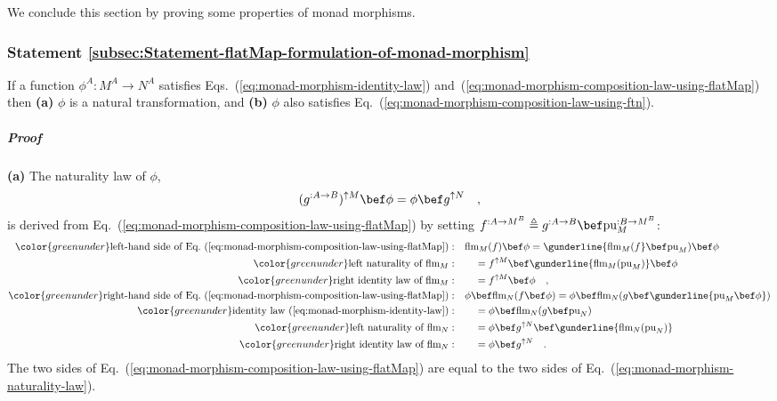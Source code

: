 We conclude this section by proving some properties of monad morphisms.

\subsubsection{Statement \label{subsec:Statement-flatMap-formulation-of-monad-morphism}\ref{subsec:Statement-flatMap-formulation-of-monad-morphism}}

If a function $\phi^{A}:M^{A}\rightarrow N^{A}$ satisfies Eqs.~(\ref{eq:monad-morphism-identity-law})
and~(\ref{eq:monad-morphism-composition-law-using-flatMap}) then
\textbf{(a)} $\phi$ is a natural transformation, and \textbf{(b)}
$\phi$ also satisfies Eq.~(\ref{eq:monad-morphism-composition-law-using-ftn}).

\subparagraph{Proof}

\textbf{(a)} The naturality law of $\phi$,
\begin{equation}
(g^{:A\rightarrow B})^{\uparrow M}\bef\phi=\phi\bef g^{\uparrow N}\quad,\label{eq:monad-morphism-naturality-law}
\end{equation}
is derived from Eq.~(\ref{eq:monad-morphism-composition-law-using-flatMap})
by setting $f^{:A\rightarrow M^{B}}\triangleq g^{:A\rightarrow B}\bef\text{pu}_{M}^{:B\rightarrow M^{B}}$:
\begin{align*}
{\color{greenunder}\text{left-hand side of Eq.~(\ref{eq:monad-morphism-composition-law-using-flatMap})}:}\quad & \text{flm}_{M}(f)\bef\phi=\gunderline{\text{flm}_{M}(f}\bef\text{pu}_{M})\bef\phi\\
{\color{greenunder}\text{left naturality of }\text{flm}_{M}:}\quad & \quad=f^{\uparrow M}\bef\gunderline{\text{flm}_{M}(\text{pu}_{M})}\bef\phi\\
{\color{greenunder}\text{right identity law of }\text{flm}_{M}:}\quad & \quad=f^{\uparrow M}\bef\phi\quad,\\
{\color{greenunder}\text{right-hand side of Eq.~(\ref{eq:monad-morphism-composition-law-using-flatMap})}:}\quad & \phi\bef\text{flm}_{N}(f\bef\phi)=\phi\bef\text{flm}_{N}(g\bef\gunderline{\text{pu}_{M}\bef\phi})\\
{\color{greenunder}\text{identity law~(\ref{eq:monad-morphism-identity-law})}:}\quad & \quad=\phi\bef\text{flm}_{N}(g\bef\text{pu}_{N})\\
{\color{greenunder}\text{left naturality of }\text{flm}_{N}:}\quad & \quad=\phi\bef g^{\uparrow N}\bef\gunderline{\text{flm}_{N}(\text{pu}_{N})}\\
{\color{greenunder}\text{right identity law of }\text{flm}_{N}:}\quad & \quad=\phi\bef g^{\uparrow N}\quad.
\end{align*}
The two sides of Eq.~(\ref{eq:monad-morphism-composition-law-using-flatMap})
are equal to the two sides of Eq.~(\ref{eq:monad-morphism-naturality-law}).

